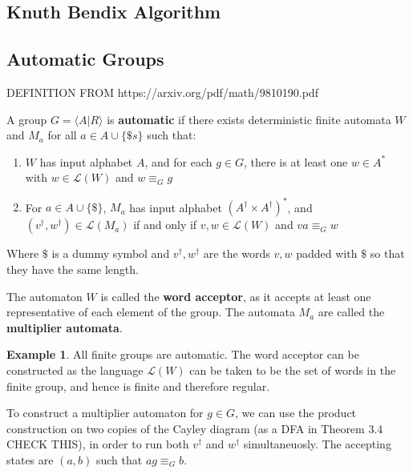 \documentclass[10pt]{article}
\theoremstyle{plain}
\theoremstyle{definition}
\newtheorem{example}[theorem]{Example}
\theoremstyle{definition}
\theoremstyle{definition}
\begin{document}
\begin{multicols}{2}
\newpage




\section{Knuth Bendix Algorithm}

\subsection{Automatic Groups}

DEFINITION FROM https://arxiv.org/pdf/math/9810190.pdf

A group $G = \langle A | R \rangle$ is \textbf{automatic} if there exists deterministic finite automata $W$ and $M_a$ for all $a \in A \cup \{ \$s \}$ such that:

\begin{enumerate}
	\item $W$ has input alphabet $A$, and for each $g \in G$, there is at least one $w \in A^*$ with $w \in \mathcal{L}(W)$ and $w \equiv_G g$
	\item For $a \in A \cup \{ \$ \}$, $M_a$ has input alphabet $(A^\dagger \times A^\dagger)^*$, and $(v^\dagger, w^\dagger) \in \mathcal{L}(M_a)$ if and only if $v, w \in \mathcal{L}(W)$ and $va \equiv_G w$
\end{enumerate}

Where $ \$ $ is a dummy symbol and $v^\dagger, w^\dagger$ are the words $v, w$ padded with $ \$ $ so that they have the same length.

The automaton $W$ is called the \textbf{word acceptor}, as it accepts at least one representative of each element of the group. The automata $M_a$ are called the \textbf{multiplier automata}.

\begin{example}
	All finite groups are automatic. The word acceptor can be constructed as the language $\mathcal{L}(W)$ can be taken to be the set of words in the finite group, and hence is finite and therefore regular.

	To construct a multiplier automaton for $g \in G$, we can use the product construction on two copies of the Cayley diagram (as a DFA in Theorem 3.4 CHECK THIS), in order to run both $v^\dagger$ and $w^\dagger$ simultaneuosly. The accepting states are $(a, b)$ such that $ag \equiv_G b$.
\end{example}


\end{multicols}
\end{document}
